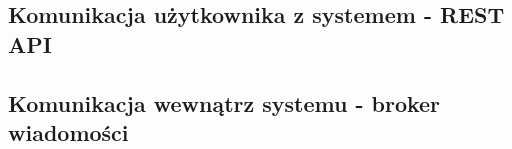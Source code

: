\documentclass[../../deliverable-two.tex]{subfiles}
\begin{document}
\subsection{Komunikacja użytkownika z systemem - REST API}

\subsection{Komunikacja wewnątrz systemu - broker wiadomości}
\end{document}
